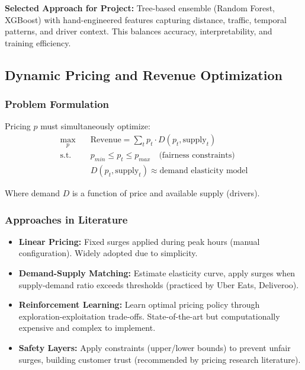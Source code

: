 \documentclass[12pt,a4paper]{report}
\begin{document}
\textbf{Selected Approach for Project:} Tree-based ensemble (Random Forest, XGBoost) with hand-engineered features capturing distance, traffic, temporal patterns, and driver context. This balances accuracy, interpretability, and training efficiency.

\subsection{Dynamic Pricing and Revenue Optimization}

\subsubsection{Problem Formulation}

Pricing $p$ must simultaneously optimize:
\begin{align}
\max_{p} \quad & \text{Revenue} = \sum_{t} p_t \cdot D(p_t, \text{supply}_t) \\
\text{s.t.} \quad & p_{min} \le p_t \le p_{max} \quad \text{(fairness constraints)} \\
& D(p_t, \text{supply}_t) \approx \text{demand elasticity model}
\end{align}

Where demand $D$ is a function of price and available supply (drivers).

\subsubsection{Approaches in Literature}

\begin{itemize}
    \item \textbf{Linear Pricing:} Fixed surges applied during peak hours (manual configuration). Widely adopted due to simplicity.
    \item \textbf{Demand-Supply Matching:} Estimate elasticity curve, apply surges when supply-demand ratio exceeds thresholds (practiced by Uber Eats, Deliveroo).
    \item \textbf{Reinforcement Learning:} Learn optimal pricing policy through exploration-exploitation trade-offs. State-of-the-art but computationally expensive and complex to implement.
    \item \textbf{Safety Layers:} Apply constraints (upper/lower bounds) to prevent unfair surges, building customer trust (recommended by pricing research literature).
\end{itemize}
\end{document}

